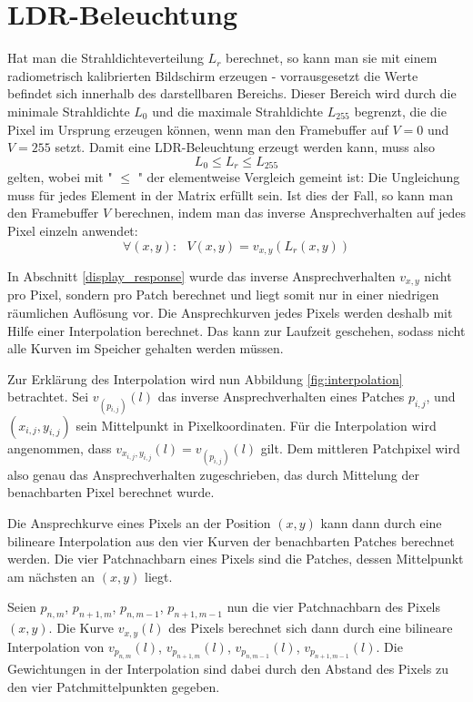  \section {LDR-Beleuchtung}  \label{ldr}
   Hat man die Strahldichteverteilung $L_r$ berechnet, so kann man sie mit einem radiometrisch kalibrierten Bildschirm erzeugen - vorrausgesetzt die Werte befindet sich innerhalb des darstellbaren Bereichs.
   Dieser Bereich wird durch die minimale Strahldichte $L_{0}$ und die maximale Strahldichte $L_{255}$ begrenzt, die die Pixel im Ursprung erzeugen können, wenn man den Framebuffer auf $V=0$ und $V=255$ setzt.
   Damit eine LDR-Beleuchtung erzeugt werden kann, muss also
   \begin{equation}
     L_0 \le L_r \le L_{255} 
   \end{equation}
   gelten, wobei mit " $\le$ " der elementweise Vergleich gemeint ist: Die Ungleichung muss für jedes Element in der Matrix erfüllt sein.
   Ist dies der Fall, so kann man den Framebuffer $V$ berechnen, indem man das inverse Ansprechverhalten auf jedes Pixel einzeln anwendet:
   \begin{equation}
     \forall (x,y): \ \ \  V(x,y) = v_{x,y}(L_r(x,y))
   \end{equation}

   In Abschnitt \ref{display_response} wurde das inverse Ansprechverhalten $v_{x,y}$ nicht pro Pixel, sondern pro Patch berechnet und liegt somit nur in einer niedrigen räumlichen Auflösung vor.
   Die Ansprechkurven jedes Pixels werden deshalb mit Hilfe einer Interpolation berechnet. 
   Das kann zur Laufzeit geschehen, sodass nicht alle Kurven im Speicher gehalten werden müssen. 

   Zur Erklärung des Interpolation wird nun Abbildung \ref{fig:interpolation} betrachtet.
   Sei $v_{ (p_{i,j}) } (l)$ das inverse Ansprechverhalten eines Patches $p_{i,j}$, und $(x_{i,j},y_{i,j})$ sein Mittelpunkt in Pixelkoordinaten.
   Für die Interpolation wird angenommen, dass $v_{x_{i,j},y_{i,j}}(l) = v_{ (p_{i,j}) }(l) $ gilt.
   Dem mittleren Patchpixel wird also genau das Ansprechverhalten zugeschrieben, das durch Mittelung der benachbarten Pixel berechnet wurde. 

   Die Ansprechkurve eines Pixels an der Position $(x,y)$ kann dann durch eine bilineare Interpolation aus den vier Kurven der benachbarten Patches berechnet werden.
   Die vier Patchnachbarn eines Pixels sind die Patches, dessen Mittelpunkt am nächsten an $(x,y)$ liegt.
 
   Seien $p_{n,m}$,\hspace{2mm}  $ p_{n+1,m}$,\hspace{2mm} $ p_{n,m-1}$,\hspace{2mm} $ p_{n+1,m-1}$ nun die vier Patchnachbarn des Pixels $(x,y)$.
   Die Kurve $v_{x,y}(l)$ des Pixels berechnet sich dann durch eine bilineare Interpolation von  $v_{p_{n,m}}(l)$,\hspace{2mm} $v_{p_{n+1,m}}(l)$,\hspace{2mm}   $  v_{p_{n,m-1}}(l)$,\hspace{2mm} $ v_{p_{n+1,m-1}}(l)$.
   Die Gewichtungen in der Interpolation sind dabei durch den Abstand des Pixels zu den vier Patchmittelpunkten gegeben.

